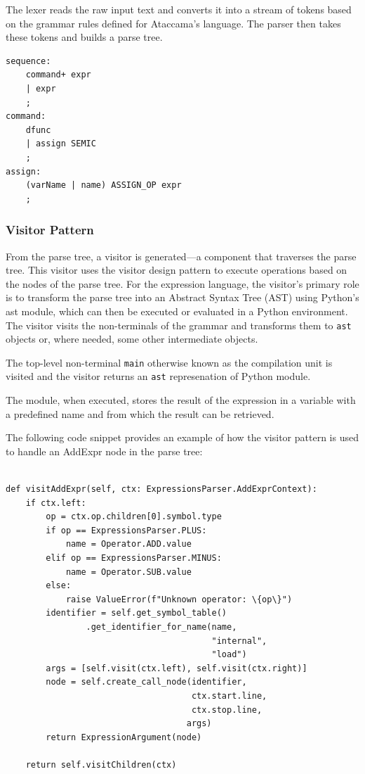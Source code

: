 The lexer reads the raw input text and converts it into a stream of tokens based on the grammar rules defined for Ataccama’s language. The parser then takes these tokens and builds a parse tree.

\begin{verbatim}
sequence:
    command+ expr
    | expr
    ;
command:
    dfunc
    | assign SEMIC
    ;
assign:
    (varName | name) ASSIGN_OP expr
    ;
\end{verbatim}

\subsubsection{Visitor Pattern}
 From the parse tree, a visitor is generated—a component that traverses the parse tree. This visitor uses the visitor design pattern to execute operations based on the nodes of the parse tree. For the expression language, the visitor's primary role is to transform the parse tree into an Abstract Syntax Tree (AST) using Python’s ast module, which can then be executed or evaluated in a Python environment. The visitor visits the non-terminals of the grammar and transforms them to \texttt{ast} objects or, where needed, some other intermediate objects.

The top-level non-terminal \texttt{main} otherwise known as the compilation unit is visited and the visitor returns an \texttt{ast} represenation of Python module.

The module, when executed, stores the result of the expression in a variable with a predefined name and from which the result can be retrieved.

The following code snippet provides an example of how the visitor pattern is used to handle an AddExpr node in the parse tree:

\begin{verbatim}
    
def visitAddExpr(self, ctx: ExpressionsParser.AddExprContext):
    if ctx.left:
        op = ctx.op.children[0].symbol.type
        if op == ExpressionsParser.PLUS:
            name = Operator.ADD.value
        elif op == ExpressionsParser.MINUS:
            name = Operator.SUB.value
        else:
            raise ValueError(f"Unknown operator: \{op\}")
        identifier = self.get_symbol_table()
                .get_identifier_for_name(name,
                                         "internal",
                                         "load")
        args = [self.visit(ctx.left), self.visit(ctx.right)]
        node = self.create_call_node(identifier, 
                                     ctx.start.line,
                                     ctx.stop.line,
                                    args)
        return ExpressionArgument(node)

    return self.visitChildren(ctx)

\end{verbatim}

